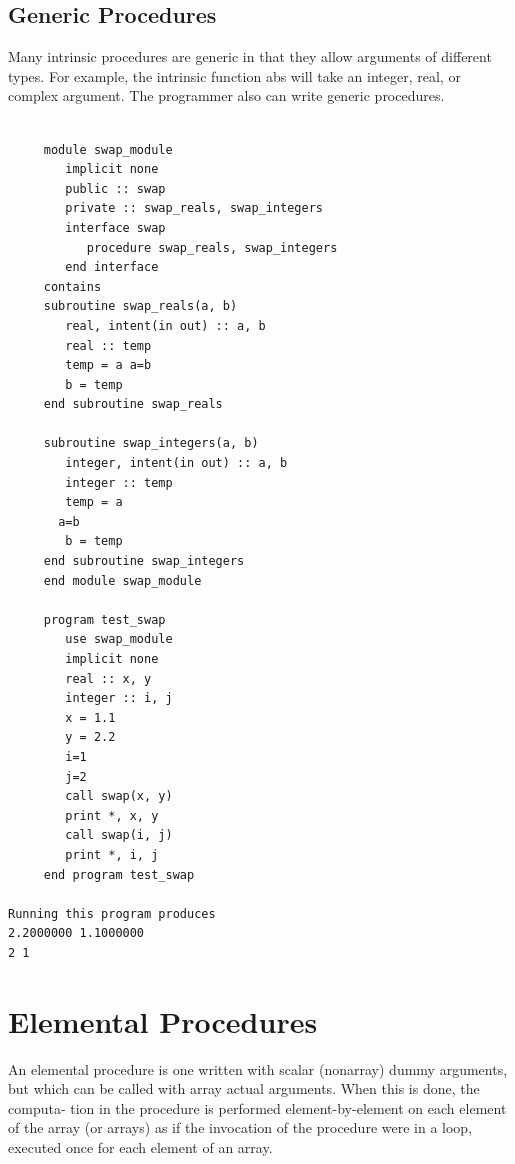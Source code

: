 \subsection{Generic Procedures}

Many intrinsic procedures are generic in that they allow arguments of different types. For example, the intrinsic function abs will take an integer, real, or complex argument. The programmer also can write generic procedures.

\begin{verbatim}

     module swap_module
        implicit none
        public :: swap
        private :: swap_reals, swap_integers
        interface swap
           procedure swap_reals, swap_integers
        end interface
     contains
     subroutine swap_reals(a, b)
        real, intent(in out) :: a, b
        real :: temp
        temp = a a=b
        b = temp
     end subroutine swap_reals
     
     subroutine swap_integers(a, b)
        integer, intent(in out) :: a, b
        integer :: temp
        temp = a
       a=b
        b = temp
     end subroutine swap_integers
     end module swap_module
     
     program test_swap
        use swap_module
        implicit none
        real :: x, y
        integer :: i, j
        x = 1.1
        y = 2.2
        i=1 
        j=2
        call swap(x, y)
        print *, x, y
        call swap(i, j)
        print *, i, j
     end program test_swap
     
Running this program produces
2.2000000 1.1000000 
2 1
\end{verbatim}

\section{Elemental Procedures}
An elemental procedure is one written with scalar (nonarray) dummy arguments, but which can be called with array actual arguments. When this is done, the computa- tion in the procedure is performed element-by-element on each element of the array (or arrays) as if the invocation of the procedure were in a loop, executed once for each element of an array.

